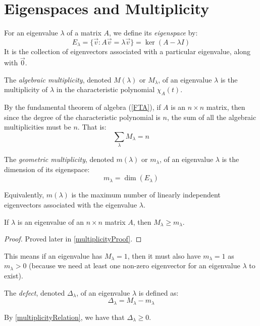 \documentclass[../main.tex]{subfiles}
\begin{document}
\section{Eigenspaces and Multiplicity}
\begin{definition}[Eigenspace]
  For an eigenvalue $\lambda$ of a matrix $A$, we define its \textit{eigenspace} by:
  \[
    E_\lambda = \{\vec{v} : A \vec{v} = \lambda \vec{v}\} = \ker (A - \lambda I)
  \]
  It is the collection of eigenvectors associated with a particular eigenvalue, along with $\vec{0}$.
\end{definition}
\begin{definition}
  The \textit{algebraic multiplicity}, denoted $M(\lambda)$ or $M_\lambda$, of an eigenvalue $\lambda$ is the multiplicity of $\lambda$ in the characteristic polynomial $\chi_A(t)$.
\end{definition}
By the fundamental theorem of algebra (\cref{FTA}), if $A$ is an $n \times n$ matrix, then since the degree of the characteristic polynomial is $n$, the sum of all the algebraic multiplicities must be $n$.
That is:
\[
  \sum_{\lambda} M_\lambda = n
\]
\begin{definition}
  The \textit{geometric multiplicity}, denoted $m(\lambda)$ or $m_\lambda$, of an eigenvalue $\lambda$ is the dimension of its eigenspace:
  \[
    m_\lambda = \dim (E_\lambda)
  \]
\end{definition}
Equivalently, $m(\lambda)$ is the maximum number of linearly independent eigenvectors associated with the eigenvalue $\lambda$.
\begin{proposition}
  If $\lambda$ is an eigenvalue of an $n \times n$ matrix $A$, then $M_\lambda \geq m_\lambda$. \label{multiplicityRelation}
\end{proposition}
\begin{proof}
  Proved later in \cref{multiplicityProof}.
\end{proof}
This means if an eigenvalue has $M_\lambda = 1$, then it must also have $m_\lambda = 1$ as $m_\lambda > 0$ (because we need at least one non-zero eigenvector for an eigenvalue $\lambda$ to exist).
\begin{definition}
  The \textit{defect}, denoted $\Delta_\lambda$, of an eigenvalue $\lambda$ is defined as:
  \[
    \Delta_\lambda = M_\lambda - m_\lambda
  \]
\end{definition}
By \cref{multiplicityRelation}, we have that $\Delta_\lambda \geq 0$.
\end{document}
